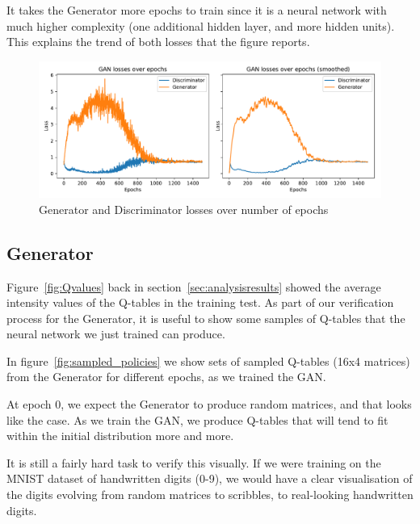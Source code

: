 It takes the Generator more epochs to train since it is a neural network with much higher complexity (one additional hidden layer, and more hidden units). This explains the trend of both losses that the figure reports.

\begin{figure}
\centering
\includegraphics[width=15cm]{Figures/GAN_losses}
\caption{Generator and Discriminator losses over number of epochs}
\label{fig:GANLosses}
\end{figure}

\subsection{Generator}
Figure~\ref{fig:Qvalues} back in section~\ref{sec:analysisresults} showed the average intensity values of the Q-tables in the training test. As part of our verification process for the Generator, it is useful to show some samples of Q-tables that the neural network we just trained can produce.

In figure~\ref{fig:sampled_policies} we show sets of sampled Q-tables (16x4 matrices) from the Generator for different epochs, as we trained the GAN.

At epoch 0, we expect the Generator to produce random matrices, and that looks like the case. As we train the GAN, we produce Q-tables that will tend to fit within the initial distribution more and more.

It is still a fairly hard task to verify this visually. If we were training on the MNIST dataset of handwritten digits (0-9), we would have a clear visualisation of the digits evolving from random matrices to scribbles, to real-looking handwritten digits.

